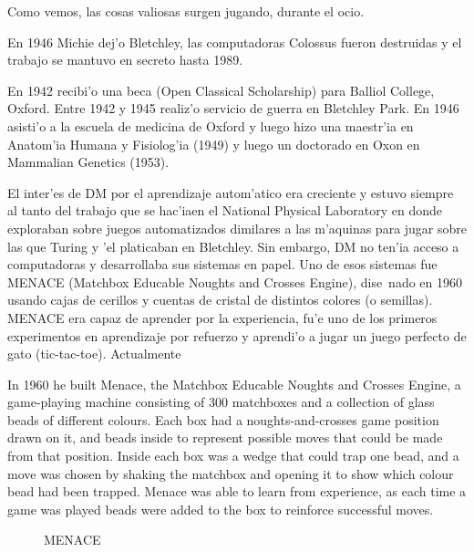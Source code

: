 \documentclass[11pt]{article}
\begin{document}
Como vemos, las cosas valiosas surgen jugando, durante el ocio.


En 1946 Michie dej'o Bletchley, las computadoras Colossus fueron destruidas y el trabajo se mantuvo en secreto hasta 1989.

En 1942 recibi'o una beca (Open Classical Scholarship) para Balliol College, Oxford. Entre 1942 y 1945 realiz'o servicio de guerra en Bletchley Park. En 1946 asisti'o a la escuela de medicina de Oxford y luego hizo una maestr'ia en Anatom'ia Humana y Fisiolog'ia (1949) y luego un doctorado en Oxon en Mammalian Genetics (1953).

El inter'es de DM por el aprendizaje autom'atico era creciente y estuvo siempre al tanto del trabajo que se hac'iaen el National Physical Laboratory en donde exploraban sobre juegos automatizados dimilares a las m'aquinas para jugar sobre las que Turing y 'el platicaban en Bletchley. Sin embargo, DM no ten'ia acceso a computadoras y desarrollaba sus sistemas en papel. Uno de esos sistemas fue MENACE (Matchbox Educable Noughts and Crosses Engine), dise~nado en 1960 usando cajas de cerillos y cuentas de cristal de distintos colores (o semillas). MENACE era capaz de aprender por la experiencia, fu'e uno de los primeros experimentos en aprendizaje por refuerzo y aprendi'o a jugar un juego perfecto de gato (tic-tac-toe). Actualmente 

In 1960 he built Menace, the Matchbox Educable Noughts and Crosses Engine, a game-playing machine consisting of 300 matchboxes and a collection of glass beads of different colours. Each box had a noughts-and-crosses game position drawn on it, and beads inside to represent possible moves that could be made from that position. Inside each box was a wedge that could trap one bead, and a move was chosen by shaking the matchbox and opening it to show which colour bead had been trapped. Menace was able to learn from experience, as each time a game was played beads were added to the box to reinforce successful moves. 

\begin{figure}[h]

\centering
{}
\caption[MENACE]{MENACE} 
\label{fig:menace}

\end{figure}

\end{document}
